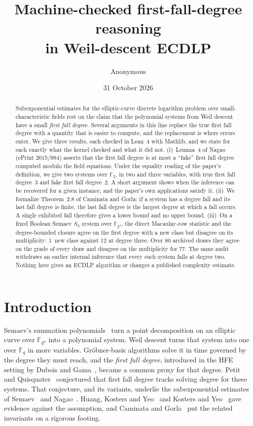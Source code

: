 \documentclass[11pt,a4paper]{article}
\title{Machine-checked first-fall-degree reasoning\\ in Weil-descent ECDLP}
\author{Anonymous}
\date{31 October 2026}
\theoremstyle{plain}
\theoremstyle{definition}
\theoremstyle{remark}
\newcommand{\FF}{\mathbb{F}}
\begin{document}
\maketitle

\begin{abstract}
Subexponential estimates for the elliptic-curve discrete logarithm problem over
small-characteristic fields rest on the claim that the polynomial systems from
Weil descent have a small \emph{first fall degree}. Several arguments in this
line replace the true first fall degree with a quantity that is easier to
compute, and the replacement is where errors enter. We give three results,
each checked in Lean~4 with Mathlib, and we state for each exactly what the
kernel checked and what it did not.
(i)~Lemma~4 of Nagao (ePrint 2015/984) asserts that the first fall degree is
at most a ``fake'' first fall degree computed modulo the field equations.
Under the equality reading of the paper's definition, we give two systems over
$\FF_2$, in two and three variables, with true first fall degree~3 and fake
first fall degree~2. A short argument shows when the inference can be
recovered for a given instance, and the paper's own applications satisfy it.
(ii)~We formalize Theorem~2.8 of Caminata and Gorla: if a system has a degree
fall and its last fall degree is finite, the last fall degree is the largest
degree at which a fall occurs. A single exhibited fall therefore gives a lower
bound and no upper bound.
(iii)~On a fixed Boolean Semaev $S_3$ system over $\FF_{2^4}$, the direct
Macaulay-row statistic and the degree-bounded closure agree on the first
degree with a new class but disagree on its multiplicity: 1~new class against
12 at degree three. Over 80 archived draws they agree on the grade of every
draw and disagree on the multiplicity for 77. The same audit withdraws an
earlier internal inference that every such system falls at degree two.
Nothing here gives an ECDLP algorithm or changes a published complexity
estimate.
\end{abstract}

\section{Introduction}

Semaev's summation polynomials~\cite{semaev04} turn a point decomposition on an
elliptic curve over $\FF_{q^n}$ into a polynomial system. Weil descent turns
that system into one over $\FF_q$ in more variables. Gr\"obner-basis
algorithms solve it in time governed by the degree they must reach, and the
\emph{first fall degree}, introduced in the HFE setting by Dubois and
Gama~\cite{duboisgama}, became a common proxy for that degree. Petit and
Quisquater~\cite{petitquisquater} conjectured that first fall degree tracks
solving degree for these systems. That conjecture, and its variants, underlie
the subexponential estimates of Semaev~\cite{semaev15} and
Nagao~\cite{nagao13,nagao15}. Huang, Kosters and Yeo~\cite{hky} and Kosters and
Yeo~\cite{kostersyeo} gave evidence against the assumption, and Caminata and
Gorla~\cite{cg} put the related invariants on a rigorous footing.
\end{document}
